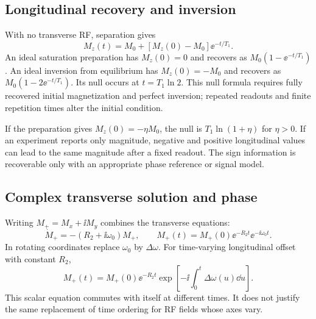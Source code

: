 \subsection{Longitudinal recovery and inversion}
With no transverse RF, separation gives
\begin{equation}
 M_z(t)=M_0+[M_z(0)-M_0]\ee^{-t/T_1}.
 \label{eq:03:recovery}
\end{equation}
An ideal saturation preparation has $M_z(0)=0$ and recovers as
$M_0(1-\ee^{-t/T_1})$.
An ideal inversion from equilibrium has $M_z(0)=-M_0$ and recovers as
$M_0(1-2\ee^{-t/T_1})$. Its null occurs at $t=T_1\ln2$.
This null formula requires fully recovered initial magnetization and
perfect inversion; repeated readouts and finite repetition times
alter the initial condition.

If the preparation gives $M_z(0)=-\eta M_0$, the null is
$T_1\ln(1+\eta)$ for $\eta>0$.
If an experiment reports only magnitude, negative and positive
longitudinal values can lead to the same magnitude after a fixed readout.
The sign information is recoverable only with an appropriate phase
reference or signal model.

\subsection{Complex transverse solution and phase}
Writing $M_+=M_x+\ii M_y$ combines the transverse equations:
\[
 \dot M_+=-(R_2+\ii\omega_0)M_+,\qquad
 M_+(t)=M_+(0)\ee^{-R_2t}\ee^{-\ii\omega_0t}.
\]
In rotating coordinates replace $\omega_0$ by $\Delta\omega$.
For time-varying longitudinal offset with constant $R_2$,
\begin{equation}
 M_+(t)=M_+(0)\ee^{-R_2t}
       \exp\left[-\ii\int_0^t\Delta\omega(u)\dd u\right].
 \label{eq:03:free}
\end{equation}
This scalar equation commutes with itself at different times.
It does not justify the same replacement of time ordering for RF fields
whose axes vary.

